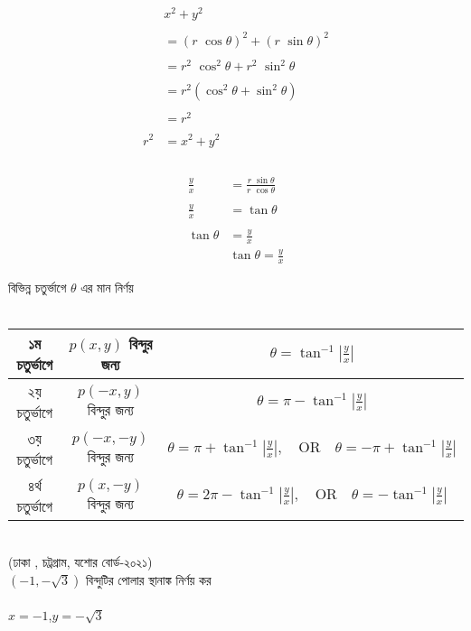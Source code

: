 \documentclass{article}
\begin{document}
\begin{multicols}{2}
\begin{align*}
	&x^2+y^2\\
	\\
	&=(r\,\,\cos \theta)^2+(r\,\,\sin \theta)^2\\
	\\
	&=r^2\,\,\cos^2 \theta+r^2\,\,\sin^2 \theta\\
	\\
	&=r^2(\cos^2 \theta+\sin^2 \theta)\\
	\\
	&=r^2\\
	\\
	r^2&=x^2+y^2\\
	&\boxed{
	}
\end{align*}
\\
\begin{align*}
	\frac{y}{x}&=\frac{r\,\,\sin \theta}{r\,\,\cos \theta}\\
	\\
	\frac{y}{x}&=\tan \theta\\
	\\
	\tan \theta &=\frac{y}{x}\\
	&\boxed{\tan \theta =\frac{y}{x}}
\end{align*}
\end{multicols}
বিভিন্ন চতুর্ভাগে $\theta $ এর মান নির্ণয় \\
\\ 
\begin{tabular}{|c|c|c|}
	\hline
	১ম চতুর্ভাগে & $p(x,y)$ বিন্দুর জন্য & $\theta= \tan^{-1}|\frac{y}{x}|$\\
	\hline 
	২য় চতুর্ভাগে & $p(-x,y)$ বিন্দুর জন্য & $\theta= \pi - \tan^{-1}|\frac{y}{x}|$\\
	\hline
	৩য় চতুর্ভাগে & $p(-x,-y)$ বিন্দুর জন্য & $\theta= \pi+\tan^{-1}|\frac{y}{x}|,\quad \mbox{OR}\quad \theta= -\pi+\tan^{-1}|\frac{y}{x}| $\\
	\hline
	৪র্থ  চতুর্ভাগে & $p(x,-y)$ বিন্দুর জন্য & $\theta= 2\pi-\tan^{-1}|\frac{y}{x}|,\quad \mbox{OR}\quad \theta= -\tan^{-1}|\frac{y}{x}| $\\
	\hline
\end{tabular}
\\
(ঢাকা , চট্রগ্রাম, যশোর বোর্ড-২০২১)\\
$(-1,-\sqrt{3})$ বিন্দুটির পোলার স্থানাঙ্ক নির্ণয় কর \\ 
\\
$x=-1$,\quad $y=-\sqrt{3}$\\
\\
\end{document}
